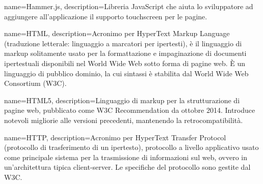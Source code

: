 {
	name=Hammer.js,
	description={Libreria JavaScript che aiuta lo sviluppatore ad aggiungere all'applicazione il supporto touchscreen per le pagine.}
}

{
	name=HTML,
	description={Acronimo per HyperText Markup Language (traduzione letterale: linguaggio a marcatori per ipertesti), è il linguaggio di markup solitamente usato per la formattazione e impaginazione di documenti ipertestuali disponibili nel World Wide Web sotto forma di pagine web. È un linguaggio di pubblico dominio, la cui sintassi è stabilita dal World Wide Web Consortium (W3C).}
}

{
	name=HTML5,
	description={Linguaggio di markup per la strutturazione di pagine web, pubblicato come W3C Recommendation da ottobre 2014. Introduce notevoli migliorie alle versioni precedenti, mantenendo la retrocompatibilità.}
}

{
	name=HTTP,
	description={Acronimo per HyperText Transfer Protocol (protocollo di trasferimento di un ipertesto), protocollo a livello applicativo usato come principale sistema per la trasmissione di informazioni sul web, ovvero in un'architettura tipica client-server. Le specifiche del protocollo sono gestite dal W3C.}
}
